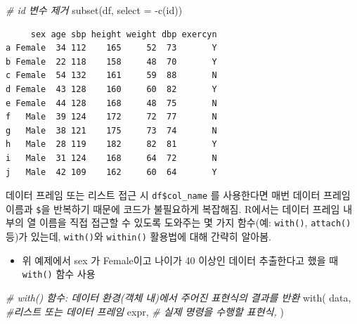 \documentclass[
  11pt,
]{krantz}
\makeatletter
\newenvironment{Shaded}{\begin{snugshade}}{\end{snugshade}}
\newcommand{\AttributeTok}[1]{\textcolor[rgb]{0.61,0.61,0.61}{#1}}
\newcommand{\CommentTok}[1]{\textcolor[rgb]{0.37,0.37,0.37}{\textit{#1}}}
\newcommand{\FunctionTok}[1]{\textcolor[rgb]{0,0,0}{#1}}
\newcommand{\NormalTok}[1]{#1}
\newcommand{\SpecialCharTok}[1]{\textcolor[rgb]{0,0,0}{#1}}
\providecommand{\tightlist}{%
  \setlength{\itemsep}{0pt}\setlength{\parskip}{0pt}}
\newenvironment{kframe}{%
\medskip{}
\setlength{\fboxsep}{.8em}
 \def\at@end@of@kframe{}%
 \ifinner\ifhmode%
  \def\at@end@of@kframe{\end{minipage}}%
  \begin{minipage}{\columnwidth}%
 \fi\fi%
 \def\FrameCommand##1{\hskip\@totalleftmargin \hskip-\fboxsep
 \colorbox{shadecolor}{##1}\hskip-\fboxsep
     \hskip-\linewidth \hskip-\@totalleftmargin \hskip\columnwidth}%
 \MakeFramed {\advance\hsize-\width
   \@totalleftmargin\z@ \linewidth\hsize
   \@setminipage}}%
 {\par\unskip\endMakeFramed%
 \at@end@of@kframe}
\newenvironment{rmdblock}[1]
  {
  \begin{itemize}
  \renewcommand{\labelitemi}{
    \raisebox{-.7\height}[0pt][0pt]{
      {\setkeys{Gin}{width=3em,keepaspectratio}\texttt{[image: images/\#1]}}
    }
  }
  \setlength{\fboxsep}{1em}
  \begin{kframe}
  \item
  }
  {
  \end{kframe}
  \end{itemize}
  }
\newenvironment{rmdnote}
  {\begin{rmdblock}{note}}
  {\end{rmdblock}}
\makeatother
\begin{document}
\begin{Shaded}
\begin{Highlighting}[]
\CommentTok{\# id 변수 제거}
\FunctionTok{subset}\NormalTok{(df, }\AttributeTok{select =} \SpecialCharTok{{-}}\FunctionTok{c}\NormalTok{(id))}
\end{Highlighting}
\end{Shaded}

\begin{verbatim}
     sex age sbp height weight dbp exercyn
a Female  34 112    165     52  73       Y
b Female  22 118    158     48  70       Y
c Female  54 132    161     59  88       N
d Female  43 128    160     60  82       Y
e Female  44 128    168     48  75       N
f   Male  39 124    172     72  77       N
g   Male  38 121    175     73  74       N
h   Male  28 119    182     82  81       Y
i   Male  31 124    168     64  72       N
j   Male  42 109    162     60  64       Y
\end{verbatim}

\normalsize

\footnotesize

\begin{rmdnote}
데이터 프레임 또는 리스트 접근 시 \texttt{df\$col\_name} 를 사용한다면 매번 데이터 프레임 이름과 \texttt{\$}을 반복하기 때문에 코드가 불필요하게 복잡해짐. R에서는 데이터 프레임 내부의 열 이름을 직접 접근할 수 있도록 도와주는 몇 가지 함수(예: \texttt{with()}, \texttt{attach()} 등)가 있는데, \texttt{with()}와 \texttt{within()} 활용법에 대해 간략히 알아봄.
\end{rmdnote}

\normalsize

\begin{itemize}
\tightlist
\item
  위 예제에서 sex 가 Female이고 나이가 40 이상인 데이터 추출한다고 했을 때 \texttt{with()} 함수 사용
\end{itemize}

\footnotesize

\begin{Shaded}
\begin{Highlighting}[]
\CommentTok{\# with() 함수: 데이터 환경(객체 내)에서 주어진 표현식의 결과를 반환}
\FunctionTok{with}\NormalTok{(}
\NormalTok{  data, }\CommentTok{\#리스트 또는 데이터 프레임}
\NormalTok{  expr, }\CommentTok{\# 실제 명령을 수행할 표현식, }
\NormalTok{)}
\end{Highlighting}
\end{Shaded}

\normalsize
\end{document}
